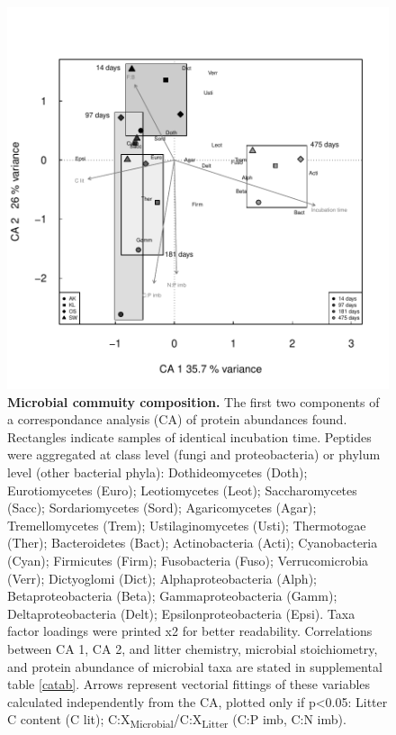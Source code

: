 \documentclass[10pt]{article}
\begin{document}
\begin{flushleft}
\newpage
\begin{figure}[h!]
\vspace*{2mm}
\begin{center}
\includegraphics{ligpaper-metaprot_pca}
\end{center}
\caption{
{\bf Microbial commuity composition.} The first two components of a correspondance analysis (CA) of protein abundances found. Rectangles indicate samples of identical incubation time. Peptides were aggregated at class level (fungi and proteobacteria) or phylum level (other bacterial phyla): Dothideomycetes (Doth); Eurotiomycetes (Euro); Leotiomycetes (Leot); Saccharomycetes (Sacc); Sordariomycetes (Sord); Agaricomycetes (Agar); Tremellomycetes (Trem); Ustilaginomycetes (Usti); Thermotogae (Ther); Bacteroidetes (Bact); Actinobacteria (Acti); Cyanobacteria (Cyan); Firmicutes (Firm); Fusobacteria (Fuso); Verrucomicrobia (Verr); Dictyoglomi (Dict); Alphaproteobacteria (Alph); Betaproteobacteria (Beta); Gammaproteobacteria (Gamm); Deltaproteobacteria (Delt); Epsilonproteobacteria (Epsi). Taxa factor loadings were printed x2 for better readability. Correlations between CA 1, CA 2, and litter chemistry, microbial stoichiometry, and protein abundance of microbial taxa are stated in supplemental table \ref{catab}. 
Arrows represent vectorial fittings of these variables calculated independently from the CA, plotted only if p\textless 0.05: Litter C content (C lit); C:X\textsubscript{Microbial}/C:X\textsubscript{Litter} (C:P imb, C:N imb).}
\end{figure}


\end{flushleft}
\end{document}
